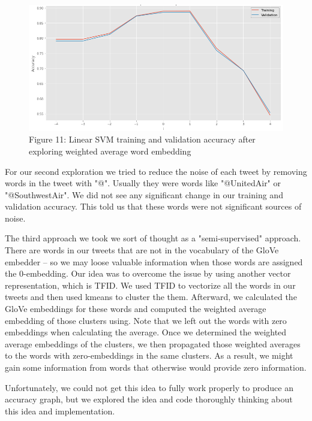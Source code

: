 \documentclass[12pt,article]{article}
\begin{document}
\begin{figure}[H]
\centering
\includegraphics[scale = 0.45]{images/part2_exploration1.png}    
\captionsetup{labelformat=empty}
\vspace{-5pt}
\caption{\scriptsize{\;\;\;\;\;\;\;\;\;\;\;\;\;Figure 11: Linear SVM training and validation accuracy after exploring weighted average word embedding}}
\end{figure}

For our second exploration we tried to reduce the noise of each tweet by removing words in the tweet with "@". Usually they were words like "@UnitedAir" or "@SouthwestAir". We did not see any significant change in our training and validation accuracy.  This told us that these words were not significant sources of noise. \newline


The third approach we took we sort of thought as a "semi-supervised" approach. There are words in our tweets that are not in the vocabulary of the GloVe embedder -- so we may loose valuable information when those words are assigned the 0-embedding. Our idea was to overcome the issue by using another vector representation, which is TFID. We used TFID to vectorize all the words in our tweets and then used kmeans to cluster the them. Afterward, we calculated the GloVe embeddings for these words and computed the weighted average embedding of those clusters using. Note that we left out the words with zero embeddings when calculating the average. Once we determined the weighted average embeddings of the clusters, we then propagated those weighted averages to the words with zero-embeddings in the same clusters. As a result, we might gain some information from words that otherwise would provide zero information. \newline

Unfortunately, we could not get this idea to fully work properly to produce an accuracy graph, but we explored the idea and code thoroughly thinking about this idea and implementation.
\end{document}
